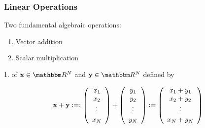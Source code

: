 \begin{frame}
    \frametitle{Linear Operations}

    \vspace{2em}
    
    Two fundamental algebraic operations: 
    \begin{enumerate}
        \item Vector addition 
        \item Scalar multiplication
    \end{enumerate}
    
    
    1.  of $\boldx \in \RR^N$ and $\boldy \in \RR^N$ defined by
    
    \begin{equation*}
        {\mathbf x} + {\mathbf y} 
        :=: 
        \left(
        \begin{array}{c}
            x_1 \\
            x_2 \\
            \vdots \\
            x_N
        \end{array}
        \right)
        +
        \left(
        \begin{array}{c}
             y_1 \\
             y_2 \\
            \vdots \\
             y_N
        \end{array}
        \right)
        :=
        \left(
        \begin{array}{c}
            x_1 + y_1 \\
            x_2 + y_2 \\
            \vdots \\
            x_N + y_N
        \end{array}
        \right)
    \end{equation*}


\end{frame}


